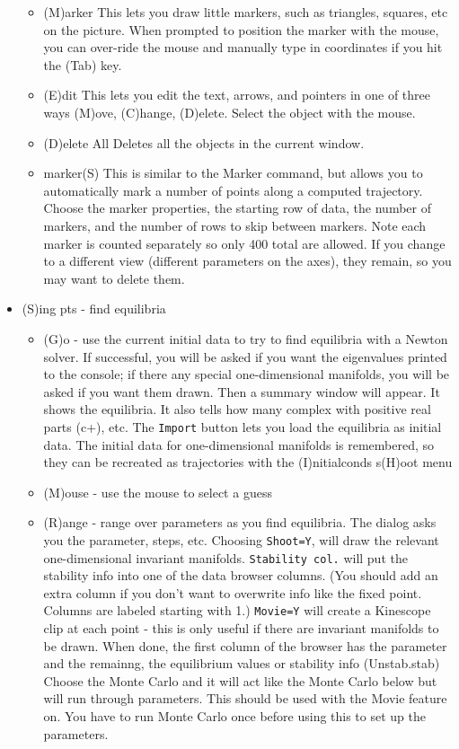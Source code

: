 \documentclass{article}
\begin{document}
\begin{itemize}
\begin{itemize}
\item (M)arker This lets you draw little markers, such as triangles,
squares, etc on the picture. When prompted to position the marker with
the mouse, you can over-ride the mouse and manually type in
coordinates if you hit the (Tab) key.
\item (E)dit This lets you edit the text, arrows, and pointers in one of three ways (M)ove, (C)hange, (D)elete. Select the object with the mouse.
\item (D)elete All Deletes all the objects in the current window.
\item marker(S) This is similar to the Marker command, but allows you to
automatically mark a number of points along a computed trajectory. 
Choose the marker properties, the starting row of data, the number of markers, and the number of rows to skip between markers. Note each marker is counted separately so only 400 total are allowed.  If you change to a different view (different parameters on the axes), they remain, so you may want to delete them.
\end{itemize}
\item (S)ing pts - find equilibria
\begin{itemize}
\item (G)o - use the current initial data to try to find equilibria with a Newton solver. If successful, you will be asked if you want the eigenvalues printed to the console; if there any special one-dimensional manifolds, you will be asked if you want them drawn. Then a summary window will appear. It shows the equilibria. It also tells how many complex with positive real parts (c+), etc. The {\tt Import} button lets you load the equilibria as initial data. The initial data for one-dimensional manifolds is remembered, so they can be recreated as trajectories with the (I)nitialconds s(H)oot menu
\item (M)ouse - use the mouse to select a guess
\item (R)ange - range over parameters as you find equilibria. The dialog asks you the parameter, steps, etc. Choosing {\tt Shoot=Y}, will draw the relevant one-dimensional invariant manifolds. {\tt Stability col.} will put the stability info into one of the data browser columns. (You should add an extra column if you don't want to overwrite info like the fixed point. Columns are labeled starting with 1.) {\tt Movie=Y} will create a Kinescope clip at each point - this is only useful if there are invariant manifolds to be drawn. When done, the first column of the browser has the parameter and the remainng, the equilibrium values or stability info (Unstab.stab) Choose the Monte Carlo and it will act like the Monte Carlo below but will run through parameters. This should be used with the Movie feature on.  You have to run Monte Carlo once before using this to set up the parameters. 

\end{itemize}
\end{itemize}
\end{document}
